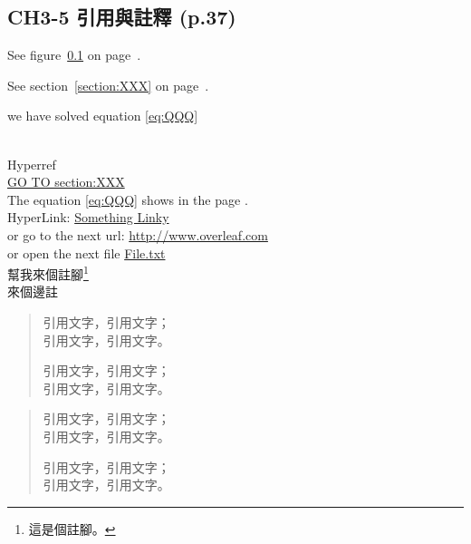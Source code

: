 \documentclass[12pt]{article}
\begin{document}
\begin{CJK*}{UTF8}{bkai}
	\subsection{CH3-5 引用與註釋 (p.37)}


	\label{figure:test}	
	See figure~\ref{figure:test} on page~\pageref{figure:test}.
	
	\label{section:XXX}
	See section~\ref{section:XXX} on page~\pageref{section:XXX}.

	we have solved equation \eqref{eq:QQQ} %
	
	
	\mbox{}\\
	{\Large Hyperref} \\	
	\hyperref[section:XXX]{GO TO section:XXX}\\
	The equation \ref{eq:QQQ} shows in the page \pageref{eq:QQQ}.\\	
	HyperLink:  \href{http://www.overleaf.com}{Something Linky}\\
	 or go to the next url: \url{http://www.overleaf.com}\\
	 or open the next file \href{run:./file.txt}{File.txt}\\
	 
	幫我來個註腳\footnote{這是個註腳。}\\
	
	來個邊註\\

	\begin{quote}
		引用文字，引用文字；\\
		引用文字，引用文字。
		
		引用文字，引用文字；\\
		引用文字，引用文字。
	\end{quote}
	
	\begin{quotation}
		引用文字，引用文字；\\
		引用文字，引用文字。
		
		引用文字，引用文字；\\
		引用文字，引用文字。
	\end{quotation}


\end{CJK*}
\end{document}
